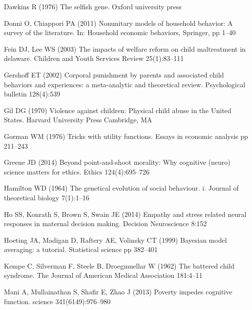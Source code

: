 \begin{thebibliography}{50}
Dawkins R (1976) The selfish gene. Oxford university press

Donni O, Chiappori PA (2011) Nonunitary models of household behavior: A survey
  of the literature. In: Household economic behaviors, Springer, pp 1--40

Fein DJ, Lee WS (2003) The impacts of welfare reform on child maltreatment in
  delaware. Children and Youth Services Review 25(1):83--111

Gershoff ET (2002) Corporal punishment by parents and associated child
  behaviors and experiences: a meta-analytic and theoretical review.
  Psychological bulletin 128(4):539

Gil DG (1970) Violence against children: Physical child abuse in the United
  States. Harvard University Press Cambridge, MA

Gorman WM (1976) Tricks with utility functions. Essays in economic analysis pp
  211--243

Greene JD (2014) Beyond point-and-shoot morality: Why cognitive (neuro) science
  matters for ethics. Ethics 124(4):695--726

Hamilton WD (1964) The genetical evolution of social behaviour. i. Journal of
  theoretical biology 7(1):1--16

Ho SS, Konrath S, Brown S, Swain JE (2014) Empathy and stress related neural
  responses in maternal decision making. Decision Neuroscience 8:152

Hoeting JA, Madigan D, Raftery AE, Volinsky CT (1999) Bayesian model averaging:
  a tutorial. Statistical science pp 382--401

Kempe C, Silverman F, Steele B, Droegmuellar W (1962) The battered child
  syndrome. The Journal of American Medical Association 181:4--11

Mani A, Mullainathan S, Shafir E, Zhao J (2013) Poverty impedes cognitive
  function. science 341(6149):976--980


\end{thebibliography}
